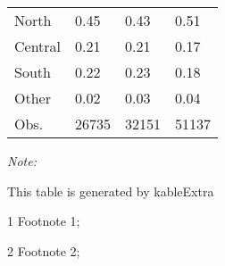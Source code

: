 \begin{table}
\begin{threeparttable}
\begin{tabular}[t]{llll}
\hspace{1em}North & 0.45 & 0.43 & 0.51\\
\hspace{1em}Central & 0.21 & 0.21 & 0.17\\
\hspace{1em}South & 0.22 & 0.23 & 0.18\\
\hspace{1em}Other & 0.02 & 0.03 & 0.04\\
Obs. & 26735 & 32151 & 51137\\
\bottomrule
\end{tabular}
\begin{tablenotes}
\item \textit{Note: } 
\item This table is generated by kableExtra
\item[1] Footnote 1; 
\item[2] Footnote 2; 
\end{tablenotes}
\end{threeparttable}
\end{table}
